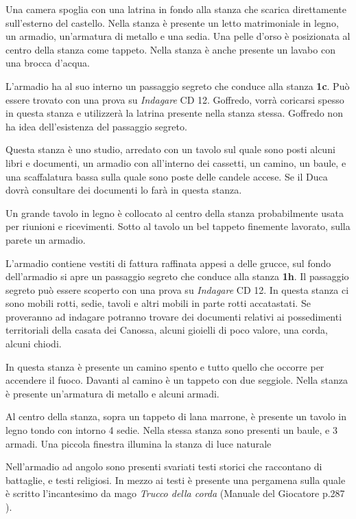 \documentclass[letterpaper,twocolumn,openany,nodeprecatedcode]{dndbook}
\begin{document}
\begin{DndReadAloud}
Una camera spoglia con una latrina in fondo alla stanza che scarica direttamente sull'esterno del castello. Nella stanza è presente un letto matrimoniale in legno, un armadio, un'armatura di metallo e una sedia. Una pelle d'orso è posizionata al centro della stanza come tappeto. Nella stanza è anche presente un lavabo con una brocca d'acqua.
\end{DndReadAloud}
L'armadio ha al suo interno un passaggio segreto che conduce alla stanza \textbf{1c}. Può essere trovato con una prova su \textit{Indagare} CD 12. Goffredo, vorrà coricarsi spesso in questa stanza e utilizzerà la latrina presente nella stanza stessa. Goffredo non ha idea dell'esistenza del passaggio segreto.

Questa stanza è uno studio, arredato con un tavolo sul quale sono posti alcuni libri e documenti, un armadio con all'interno dei cassetti, un camino, un baule, e una scaffalatura bassa sulla quale sono poste delle candele accese.
Se il Duca dovrà consultare dei documenti lo farà in questa stanza.

\begin{DndReadAloud}
Un grande tavolo in legno è collocato al centro della stanza probabilmente usata per riunioni e ricevimenti. Sotto al tavolo un bel tappeto finemente lavorato, sulla parete un armadio.
\end{DndReadAloud}
L'armadio contiene vestiti di fattura raffinata appesi a delle grucce, sul fondo dell'armadio si apre un passaggio segreto che conduce alla stanza \textbf{1h}. Il passaggio segreto può essere scoperto con una prova su \textit{Indagare} CD 12.
In questa stanza ci sono mobili  rotti, sedie, tavoli e altri mobili in parte rotti accatastati. Se proveranno ad indagare potranno trovare dei documenti relativi ai possedimenti territoriali della casata dei Canossa, alcuni gioielli di poco valore, una corda, alcuni chiodi.

In questa stanza è presente un camino spento e tutto quello che occorre per accendere il fuoco. Davanti al camino è un tappeto con due seggiole. Nella stanza è presente un'armatura di metallo e alcuni armadi.

\begin{DndReadAloud}
Al centro della stanza, sopra un tappeto di lana marrone, è presente un tavolo in legno tondo con intorno 4 sedie. Nella stessa stanza sono presenti un baule, e 3 armadi. Una piccola finestra illumina la stanza di luce naturale

Nell'armadio ad angolo sono presenti svariati testi storici che raccontano di battaglie, e testi religiosi. In mezzo ai testi è presente una pergamena sulla quale è scritto l'incantesimo da mago \textit{Trucco della corda} (Manuale del Giocatore p.287 \cite{dnd:giocatore}).
\end{DndReadAloud}
\end{document}

